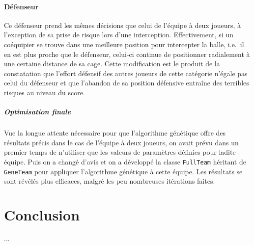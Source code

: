\documentclass[12pt,a4paper]{article}
\begin{document}
\subsection*{D\'efenseur}
Ce d\'efenseur prend les m\^emes d\'ecisions que celui de l'\'equipe \`a 
deux joueurs, \`a l'exception de sa prise de risque lors d'une interception. 
Effectivement, si un co\'equipier se trouve dans une meilleure position pour 
intercepter la balle, i.e.\ il en est plus proche que le d\'efenseur, celui-ci 
continue de positionner radialement \`a une certaine distance de sa cage. Cette 
modification est le produit de la constatation que l'effort d\'efensif des 
autres joueurs de cette cat\'egorie n'\'egale pas celui du d\'efenseur et que 
l'abandon de sa position d\'efensive entra\^ine des terribles risques au 
niveau du score.

\subsubsection*{Optimisation finale}
Vue la longue attente n\'ecessaire pour que l'algorithme g\'en\'etique offre 
des r\'esultats pr\'ecis dans le cas de l'\'equipe \`a deux joueurs, on avait 
pr\'evu dans un premier temps de n'utiliser que les valeurs de param\`etres 
d\'efinies pour ladite \'equipe. Puis on a chang\'e d'avis et on a 
d\'evelopp\'e la classe \texttt{FullTeam} h\'eritant de \texttt{GeneTeam} pour 
appliquer l'algorithme g\'en\'etique \`a cette \'equipe. Les r\'esultats se 
sont r\'ev\'el\'es plus efficaces, malgr\'e les peu nombreuses it\'erations 
faites.

\newpage

\part*{Conclusion}
...
\end{document}
